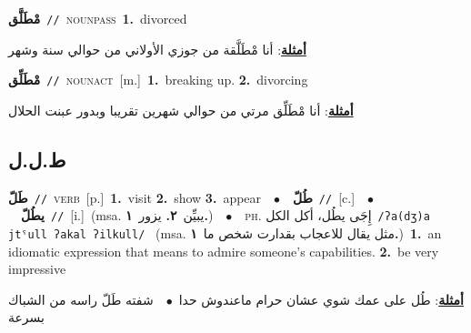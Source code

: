\documentclass[10pt,a4paper,twoside]{article} %
\begin{document}
\begin{multicols}{2}
{\setlength\topsep{0pt}\textbf{\foreignlanguage{arabic}{مْطَلَّق}}\ {\color{gray}\texttt{//}\color{black}}\ \textsc{noun\textunderscore pass}\ \textbf{1.}~divorced\  \begin{flushright}\color{gray}\foreignlanguage{arabic}{\textbf{\underline{\foreignlanguage{arabic}{أمثلة}}}: أنا مْطَلَّقة من جوزي الأولاني من حوالي سنة وشهر}\end{flushright}\color{black}} \vspace{2mm}

{\setlength\topsep{0pt}\textbf{\foreignlanguage{arabic}{مْطَلِّق}}\ {\color{gray}\texttt{//}\color{black}}\ \textsc{noun\textunderscore act}\ [m.]\ \textbf{1.}~breaking up.  \textbf{2.}~divorcing\  \begin{flushright}\color{gray}\foreignlanguage{arabic}{\textbf{\underline{\foreignlanguage{arabic}{أمثلة}}}: أنا مْطَلِّق مرتي من حوالي شهرين تقريبا  وبدور عبنت الحلال}\end{flushright}\color{black}} \vspace{2mm}

\vspace{-3mm}
\subsection*{\color{blue}\foreignlanguage{arabic}{ط.ل.ل}\color{blue}{}} 

{\setlength\topsep{0pt}\textbf{\foreignlanguage{arabic}{طَلّ}}\ {\color{gray}\texttt{//}\color{black}}\ \textsc{verb}\ [p.]\ \textbf{1.}~visit  \textbf{2.}~show  \textbf{3.}~appear\ \ $\bullet$\ \ \setlength\topsep{0pt}\textbf{\foreignlanguage{arabic}{طُلّ}}\ {\color{gray}\texttt{//}\color{black}}\ [c.]\ \ $\bullet$\ \ \setlength\topsep{0pt}\textbf{\foreignlanguage{arabic}{يطُلّ}}\ {\color{gray}\texttt{//}\color{black}}\ [i.]\ \color{gray}(msa. \foreignlanguage{arabic}{يبيِّن}~\foreignlanguage{arabic}{\textbf{٢.}}  \foreignlanguage{arabic}{يزور}~\foreignlanguage{arabic}{\textbf{١.}})\color{black}\ \ $\bullet$\ \ \textsc{ph.} \color{gray} \foreignlanguage{arabic}{إِجَى يطُل، أكل الكل}\color{black}\ {\color{gray}\texttt{/{\sffamily ʔa(dʒ)a jtˤull ʔakal ʔilkull}/}\color{black}}\ \color{gray} (msa. \foreignlanguage{arabic}{مثل يقال للاعجاب بقدارت شخص ما}~\foreignlanguage{arabic}{\textbf{١.}})\color{black}\ \textbf{1.}~an idiomatic expression that means  to admire someone's capabilities.  \textbf{2.}~be very impressive\  \begin{flushright}\color{gray}\foreignlanguage{arabic}{\textbf{\underline{\foreignlanguage{arabic}{أمثلة}}}: طُل على عمك شوي عشان حرام ماعندوش حدا\ $\bullet$\ \  شفته طَلّ راسه من الشباك بسرعة}\end{flushright}\color{black}} \vspace{2mm}


\end{multicols}
\end{document}
